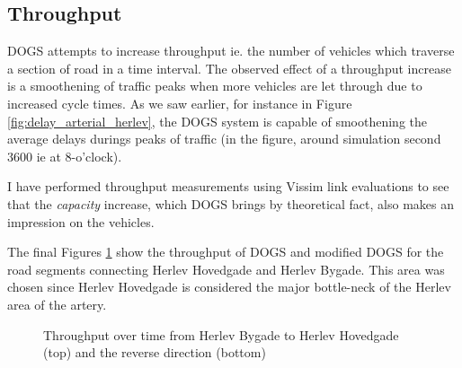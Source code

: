 \subsection{Throughput}
DOGS attempts to increase throughput ie. the number of vehicles which traverse a section of road in a time interval. The observed effect of a throughput increase is a smoothening of traffic peaks when more vehicles are let through due to increased cycle times. As we saw earlier, for instance in Figure \ref{fig:delay_arterial_herlev}, the DOGS system is capable of smoothening the average delays durings peaks of traffic (in the figure, around simulation second 3600 ie at 8-o'clock).

I have performed throughput measurements using Vissim link evaluations to see that the \textit{capacity} increase, which DOGS brings by theoretical fact, also makes an impression on the vehicles.

The final Figures \ref{fig:volume_hb-hh} show the throughput of DOGS and modified DOGS for the road segments connecting Herlev Hovedgade and Herlev Bygade. This area was chosen since Herlev Hovedgade is considered the major bottle-neck of the Herlev area of the artery.

\begin{figure}[htbp]
\centering
{}

\caption{Throughput over time from Herlev Bygade to Herlev Hovedgade (top) and the reverse direction (bottom)}
\label{fig:volume_hb-hh}
\end{figure}

